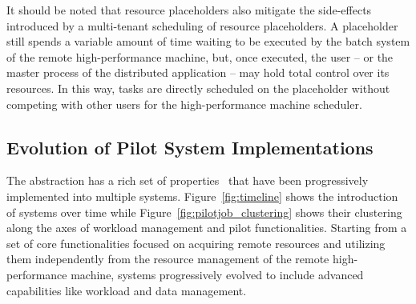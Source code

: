 \documentclass{sig-alternate}
\begin{document}
It should be noted that resource placeholders also mitigate the side-effects
introduced by a multi-tenant scheduling of resource placeholders. A placeholder
still spends a variable amount of time waiting to be executed by the batch
system of the remote high-performance machine, but, once executed, the user --
or the master process of the distributed application -- may hold total control
over its resources. In this way, tasks are directly scheduled on the placeholder
without competing with other users for the high-performance machine scheduler.


\subsection{Evolution of Pilot System Implementations}
\label{sec:histimpl}

The \pilot abstraction has a rich set of properties~\cite{luckow2012towards}
that have been progressively implemented into multiple \pilotjob systems.
Figure~\ref{fig:timeline} shows the introduction of \pilotjob systems over time
while Figure~\ref{fig:pilotjob_clustering} shows their clustering along the axes
of workload management and pilot functionalities. Starting from a set of core
functionalities focused on acquiring remote resources and utilizing them
independently from the resource management of the remote high-performance
machine, \pilotjob systems progressively evolved to include advanced
capabilities like workload and data management.

\end{document}
